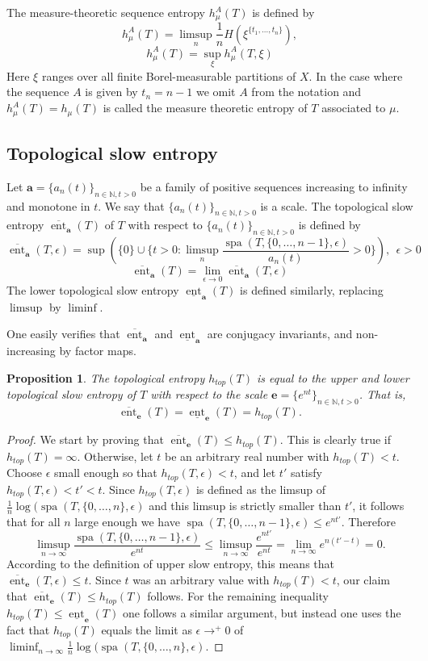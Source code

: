 \documentclass[a4paper,oneside]{amsart}
\renewcommand{\(}{\begin{dmath*}}
\renewcommand{\)}{\end{dmath*}}
\newtheorem{proposition}[theorem]{Proposition}
\theoremstyle{definition}
\newcommand{\N}{\mathbb{N}}
\newcommand{\upperent}{\overline{\operatorname{ent}}}
\newcommand{\lowerent}{\underline{\operatorname{ent}}}
\newcommand{\spa}{\operatorname{spa}}
\begin{document}
The measure-theoretic sequence entropy $h^{A}_{\mu}(T)$ is defined by
\[h^{A}_{\mu}(T)=\limsup_n \frac{1}{n}H(\xi^{\{t_1,\dots,t_n\}}),\]
\[h^{A}_{\mu}(T)=\sup_{\xi} h^{A}_{\mu}(T,\xi)\]
Here $\xi$ ranges over all finite Borel-measurable partitions of $X$. In the case where the sequence $A$ is given by $t_n=n-1$ we omit $A$ from the notation and $h^{A}_{\mu}(T)=h_{\mu}(T)$ is called the measure theoretic entropy of $T$ associated to $\mu$. 
\subsection{Topological slow entropy}
Let $\textbf{a}=\{a_n(t)\}_{n\in\N,t>0}$ be a family of positive sequences increasing to infinity and monotone in $t$. We say that $\{a_n(t)\}_{n\in\N,t>0}$ is a scale. The topological slow entropy $\upperent_{\textbf{a}}(T)$ of $T$ with respect to $\{a_n(t)\}_{n\in\N,t>0}$ is defined by  
\[\upperent_{\textbf{a}}(T,\epsilon)=\sup(\{0\}\cup\{t>0 : \limsup_n\frac{\spa(T,\{0,\dots,n-1\},\epsilon)}{a_n(t)}>0\}), \  \ \epsilon>0\]
\[\upperent_{\textbf{a}}(T)=\lim_{\epsilon\to 0} \upperent_{\textbf{a}}(T,\epsilon)\]
The lower topological slow entropy $\lowerent_{\textbf{a}}(T)$ is defined similarly, replacing $\limsup$ by $\liminf$.

One easily verifies that $\upperent_{\mathbf{a}}$ and $\lowerent_{\mathbf{a}}$ are conjugacy invariants, and non-increasing by factor maps.
\begin{proposition}\label{prop:slow-entropy-with-exponential-scale-is-entropy}
The topological entropy $h_{top}(T)$ is equal to the upper and lower topological slow entropy of $T$ with respect to   the scale $\textbf{e}=\{e^{nt}\}_{n\in\N,t>0}$. That is, 
\[\upperent_{\mathbf{e}}(T)=\lowerent_{\mathbf{e}}(T)=h_{top}(T).\]
\end{proposition}
\begin{proof}
We start by proving that $\upperent_{\mathbf{e}}(T)\leq h_{top}(T)$. This is clearly true if $h_{top}(T)=\infty$. Otherwise, let $t$ be an arbitrary real number with $h_{top}(T)<t$. Choose $\epsilon$ small enough so that $h_{top}(T,\epsilon)<t$, and let $t'$ satisfy $h_{top}(T,\epsilon)<t'<t$. Since $h_{top}(T,\epsilon)$ is defined as the limsup of $\frac{1}{n}\log(\spa(T,\{0,\dots,n\},\epsilon)$ and this limsup is strictly smaller than $t'$, it follows that for all $n$ large enough we have $\spa(T,\{0,\dots,n-1\},\epsilon)\leq e^{nt'}$. Therefore
\[\limsup_{n\to\infty} \frac{\spa(T,\{0,\dots,n-1\},\epsilon)}{e^{nt}}\leq \limsup_{n\to\infty} \frac{e^{nt'}}{e^{nt}}=\lim_{n\to\infty}e^{n(t'-t)}=0.\]
According to the definition of upper slow entropy, this means that  $\upperent_{\mathbf{e}}(T,\epsilon)\leq t$. Since $t$ was an arbitrary value with $h_{top}(T)<t$, our claim that $\upperent_{\mathbf{e}}(T)\leq h_{top}(T)$ follows.  For the remaining inequality $h_{top}(T)\leq \lowerent_{\mathbf{e}}(T)$ one follows a similar argument, but instead one uses the fact that $h_{top}(T)$ equals the limit as $\epsilon\to^+0$ of $\liminf_{n\to\infty}\frac{1}{n}\log(\spa(T,\{0,\dots,n\},\epsilon)$.\end{proof} %
\end{document}

